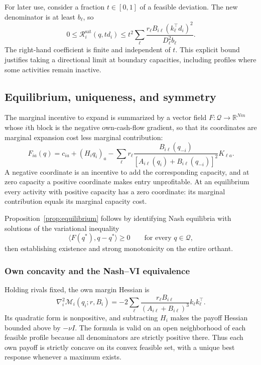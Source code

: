 For later use, consider a fraction $t\in[0,1]$ of a feasible deviation.
The new denominator is at least $b_\ell$, so
\begin{equation}\label{eq:app-remainder-order}
  0\leq\mathcal R_i^{\mathrm{sat}}(q,td_i)
  \leq t^2\sum_\ell\frac{r_\ell B_{i\ell}(k_\ell^\top d_i)^2}{D_\ell^2 b_\ell}.
\end{equation}
The right-hand coefficient is finite and independent of $t$.
This explicit bound justifies taking a directional limit at boundary capacities,
including profiles where some activities remain inactive.

\subsection{Equilibrium, uniqueness, and symmetry}\label{app:equilibrium}

The marginal incentive to expand is summarized by a vector field $F:\mathcal
Q\to\mathbb R^{Nm}$ whose $i$th block is the negative own-cash-flow gradient,
so that its coordinates are marginal expansion cost less marginal contribution:
\begin{equation}\label{eq:field}
  F_{ia}(q)=c_{ia}+(H_i q_i)_a-
  \sum_\ell r_\ell\frac{B_{i\ell}(q_{-i})}
  {[A_{i\ell}(q_i)+B_{i\ell}(q_{-i})]^2}K_{\ell a}.
\end{equation}
A negative coordinate is an incentive to add the corresponding capacity, and
at zero capacity a positive coordinate makes entry unprofitable.
At an equilibrium every activity with positive capacity has a zero
coordinate: its marginal contribution equals its marginal capacity cost.

Proposition~\ref{prop:equilibrium} follows by identifying Nash equilibria with
solutions of the variational inequality
\begin{equation}\label{eq:vi}
  \langle F(q^*),q-q^*\rangle\geq0\qquad\text{for every }q\in\mathcal Q,
\end{equation}
then establishing existence and strong monotonicity on the entire orthant.

\subsubsection{Own concavity and the Nash--VI equivalence}

Holding rivals fixed, the own margin Hessian is
\begin{equation}\label{eq:app-hessian}
  \nabla_i^2\mathcal M_i(q_i;r,B_i)
  =-2\sum_\ell\frac{r_\ell B_{i\ell}}{(A_{i\ell}+B_{i\ell})^3}
  k_\ell k_\ell^\top.
\end{equation}
Its quadratic form is nonpositive, and subtracting $H_i$ makes the
payoff Hessian
bounded above by $-\nu I$.
The formula is valid on an open neighborhood of each feasible profile
because all denominators
are strictly positive there.
Thus each own payoff is strictly concave on its convex feasible set,
with a unique
best response whenever a maximum exists.

